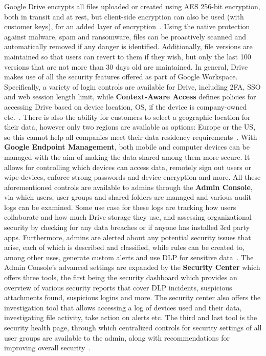 Google Drive encrypts all files uploaded or created using AES 256-bit encryption, both in transit and at rest, but client-side encryption can also be used (with customer keys), for an added layer of encryption~\cite{drive_encryption,drive_client-side}. Using the native protection against malware, spam and ransomware, files can be proactively scanned and  automatically removed if any danger is identified. Additionally, file versions are maintained so that users can revert to them if they wish, but only the last 100 versions that are not more than 30 days old are maintained.  In general, Drive makes use of all the security features offered as part of Google Workspace. Specifically, a variety of login controls are available for Drive, including 2FA, SSO and web session length limit, while \textbf{Context-Aware Access} defines policies for accessing Drive based on device location, OS, if the device is company-owned etc.~\cite{drive_login_security,drive_context-aware}. There is also the ability for customers to select a geographic location for their data, however only two regions are available as options: Europe or the US, so this cannot help all companies meet their data residency requirements~\cite{drive_regions}. With \textbf{Google Endpoint Management}, both mobile and computer devices can be managed with the aim of making the data shared among them more secure. It allows for controlling which devices can access data, remotely sign out users or wipe devices, enforce strong passwords and device encryption and more. All these aforementioned controls are available to admins  through the \textbf{Admin Console}, via which users, user groups and shared folders are managed and various audit logs can be examined. Some use case for these logs are tracking how users collaborate and how much Drive storage they use, and assessing organizational security by checking for any data breaches or if anyone has installed 3rd party apps. Furthermore, admins are alerted about any potential security issues that arise, each of which is described and classified, while rules can be created to, among other uses, generate custom alerts and use DLP for sensitive data~\cite{drive_admin,drive_rules}. The Admin Console's advanced settings are expanded by the \textbf{Security Center} which offers three tools, the first being the security dashboard which provides an overview of various security reports that cover DLP incidents, suspicious attachments found, suspicious logins and more. The security center also offers the  investigation tool that allows accessing a log of devices used and their data, investigating file activity, take action on alerts etc. The third and last tool is the security health page, through which centralized controls for security settings of all user groups are available to the admin, along with recommendations for improving overall security~\cite{google_drive,drive_security_center}.


